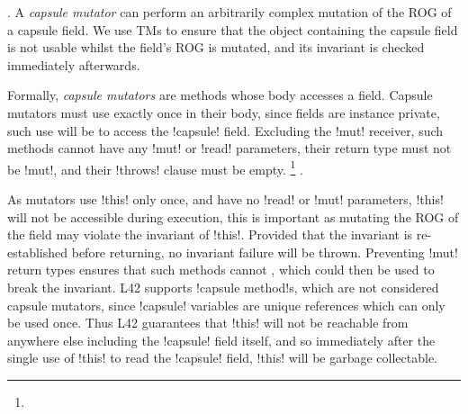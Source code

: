 . A \emph{capsule mutator} can perform an arbitrarily complex mutation of the ROG of a capsule field. We use TMs to ensure that the object containing the capsule field is not usable whilst the field's ROG is mutated, and its invariant is checked immediately afterwards. 

Formally, \emph{capsule mutators} are \Q@mut@ methods whose body accesses a \Q@capsule@ field. 
Capsule mutators must use \Q@this@ exactly once in their body, since fields are instance private, such use will be to access the \Q!capsule! field.
Excluding the \Q!mut! receiver, such methods cannot have any \Q!mut! or \Q!read! parameters, their return type must not be \Q!mut!, and their \Q!throws! clause must be empty.%
\footnote{}
.


As \Q@capsule@ mutators use \Q!this! only once,
and have no \Q!read! or \Q!mut! parameters,
\Q!this! will not be accessible during execution, this is important as mutating the ROG of the \Q@capsule@ field may violate the invariant of \Q!this!. Provided that the invariant is re-established before returning, no invariant failure will be thrown. Preventing \Q!mut! return types ensures that such methods cannot , which could then be used to break the invariant.
L42 supports \Q!capsule method!s, which are not considered capsule mutators, since \Q!capsule! variables are unique references which can only be used once. Thus L42 guarantees that \Q!this! will not be reachable from anywhere else including the \Q!capsule! field itself, and so immediately after the single use of \Q!this! to read the \Q!capsule! field, \Q!this! will be garbage collectable.

